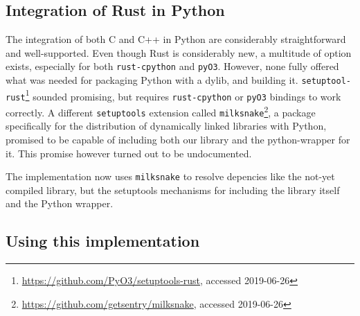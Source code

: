 \subsection{Integration of Rust in Python}\label{sec:integration}


The integration of both C and C++ in Python are considerably straightforward
and well-supported. Even though Rust is considerably new, a multitude of option
exists, especially for both \verb|rust-cpython| and \verb|pyO3|. However, none
fully offered what was needed for packaging Python with a dylib, and building
it.
\verb|setuptool-rust|\footnote{\url{https://github.com/PyO3/setuptools-rust},
accessed 2019-06-26} sounded promising, but requires \verb|rust-cpython| or
\verb|pyO3| bindings to work correctly. A different \verb|setuptools| extension
called \verb|milksnake|\footnote{\url{https://github.com/getsentry/milksnake},
accessed 2019-06-26}, a package specifically for the distribution of
dynamically linked libraries with Python, promised to be capable of including
both our library and the python-wrapper for it. This promise however turned out
to be undocumented.

The implementation now uses \verb|milksnake| to resolve depencies like the
not-yet compiled library, but the setuptools mechanisms for including the
library itself and the Python wrapper.




\subsection{Using this implementation}\label{sec:using}








